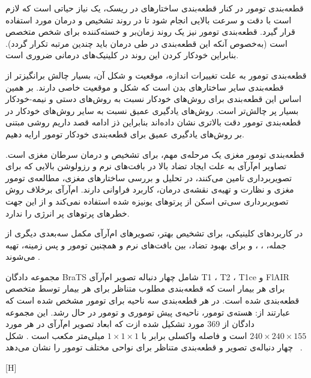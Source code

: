 قطعه‌بندی تومور در کنار قطعه‌بندی ساختارهای در ریسک، یک نیاز حیاتی است که لازم است با دقت و سرعت بالایی انجام شود تا در روند تشخیص و درمان مورد استفاده قرار گیرد. قطعه‌بندی تومور نیز یک روند زمان‌بر و خسته‌کننده برای شخص متخصص است (به‌خصوص آنکه این قطعه‌بندی در طی درمان باید چندین مرتبه تکرار گردد). بنابراین خودکار کردن این روند در کلینیک‌های درمانی ضروری است. 

قطعه‌بندی تومور به علت تغییرات اندازه، موقعیت و شکل آن، بسیار چالش‌ برانگیزتر از قطعه‌بندی سایر ساختارهای بدن است که شکل و موقعیت خاصی دارند. بر همین اساس این قطعه‌بندی برای روش‌های خودکار نسبت به روش‌های دستی و نیمه-خودکار بسیار پر چالش‌تر است. روش‌های یادگیری عمیق نسبت به سایر روش‌های  خودکار در قطعه‌بندی تومور دقت بالاتری نشان‌ داده‌اند بنابراین  ذز ادامه قصد داریم روشی مبتنی بر روش‌های یادگیری عمیق برای قطعه‌بندی خودکار تومور ارایه دهیم.


قطعه‌بندی تومور مغزی یک مرحله‌ی مهم، برای تشخیص و درمان سرطان مغزی است. تصاویر ام‌آرآی به علت ایجاد تضاد بالا در بافت‌های نرم و رزولوشن‌ بالایی که برای تصویربرداری تامین می‌کنند، در تحلیل و بررسی ساختارهای مغزی، مطالعه‌ی تومور مغزی و نظارت و تهیه‌ی نقشه‌ی درمان، کاربرد فراوانی دارند. ام‌آرآی برخلاف روش تصویربرداری سی‌تی اسکن از پرتوهای یونیزه شده استفاده نمی‌کند و از این جهت خطرهای پرتوهای پر انرژی را ندارد. 

در کاربردهای کلینیکی، برای تشخیص بهتر، تصویر‌های ام‌آرآی مکمل سه‌بعدی دیگری از جمله،  ، ، و  برای بهبود تضاد، بین بافت‌های نرم و همچنین تومور و پس زمینه، تهیه می‌شوند .

مجموعه دادگان BraTS  شامل چهار دنباله تصویر ام‌آرآی T1 ، T2 ، T1ce و FlAIR برای هر بیمار است که قطعه‌بندی مطلوب متناظر برای هر بیمار توسط متخصص قطعه‌بندی شده است. در هر قطعه‌بندی سه ناحیه برای تومور مشخص شده است که عبارتند از: هسته‌ی تومور، ناحیه‌ی پیش‌ توموری و تومور در حال رشد. این مجموعه دادگان از 369 مورد تشکیل شده ازت که ابعاد تصویر ام‌آرآی در هر مورد $240\times240\times155$ است و فاصله واکسلی برابر با $1\times1\times1$ میلی‌متر مکعب است . شکل ~ چهار دنباله‌ی تصویر و قطعه‌بندی متناظر برای نواحی مختلف تومور را نشان می‌دهد.

[H]


